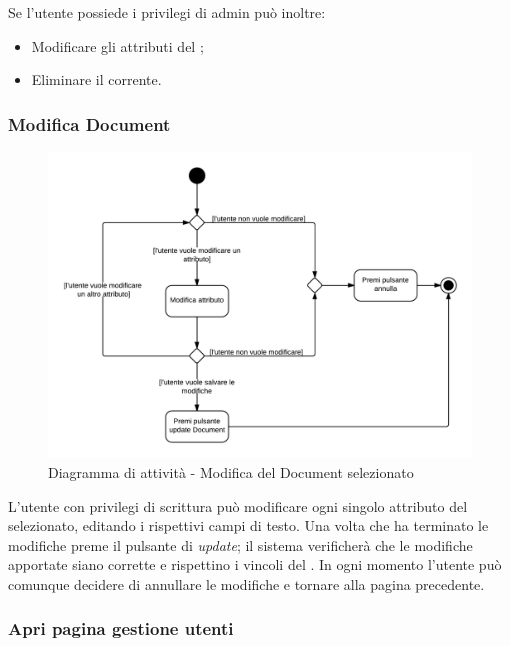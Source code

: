 Se l'utente possiede i privilegi di admin può inoltre:

\begin{itemize}

	\item Modificare gli attributi del ;
	\item Eliminare il  corrente.

\end{itemize}

\subsubsection{Modifica Document}

\begin{figure}[H]
\centering
\includegraphics[scale=0.2]{uml/MaaP - Modifica document.png}
\caption{Diagramma di attività - Modifica del Document selezionato}
\end{figure}

L'utente con privilegi di scrittura può modificare ogni singolo attributo del  selezionato, editando i rispettivi campi di testo. Una volta che ha terminato le modifiche preme il pulsante di \textit{update}; il sistema  verificherà che le modifiche apportate siano corrette e rispettino i vincoli del . In ogni momento l'utente può comunque decidere di annullare le modifiche e tornare alla pagina precedente.

\subsubsection{Apri pagina gestione utenti}

